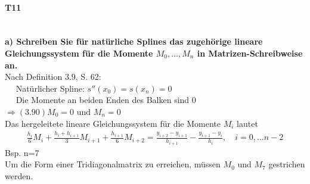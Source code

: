 \documentclass[10pt,a4paper]{article}
\begin{document}
	\paragraph{T11}\mbox{}\\
	\textbf{%
		a) Schreiben Sie für natürliche Splines das zugehörige lineare Gleichungssystem für die Momente $M_0, \dots, M_n$ in Matrizen-Schreibweise an.
	}\\
		Nach Definition 3.9, S. 62:\\
		$\mbox{}\quad$ Natürlicher Spline: $s''(x_0)=s(x_n)=0$ \\
		$\mbox{}\quad$ Die Momente an beiden Enden des Balken sind 0 $\Rightarrow (3.90) M_0=0 \text{ und } M_n=0$ \\
		Das hergeleitete lineare Gleichungssystem für die Momente $M_i$ lautet
		\begin{align*}
			\frac{h_i}{6}M_i+\frac{h_i+h_{i+1}}{3}M_{i+1}+\frac{h_{i+1}}{6}M_{i+2} 
				= \frac{y_{i+2}-y_{i+1}}{h_{i+1}}-\frac{y_{i+1}-y_i}{h_i}, \quad i = 0,\dots n-2
		\end{align*}
		Bsp. n=7 \\
		Um die Form einer Tridiagonalmatrix zu erreichen, müssen $M_0$ und $M_7$ gestrichen werden.
\end{document}

